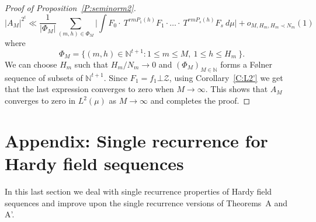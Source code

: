 \documentclass[11pt]{amsart}
\newcommand{\N}{\mathbb{N}}
\theoremstyle{plain}
\theoremstyle{definition}
\theoremstyle{remark}
\begin{document}
\begin{proof}[Proof of Proposition~\ref{P:seminorm2}]
$$
|A_M|^{2^t} \ll\frac{1}{|\Phi_M|}\sum_{(m,h)\in
  \Phi_M}\Big|\int F_0 \cdot\ T^{rmP_1(h)}F_1\cdot \ldots \cdot\
T^{rmP_s(h)}F_s\ d\mu\Big| +o_{M,H_m, H_m\prec N_m}(1)
$$
where
$$
\Phi_{M}=\{ (m,h)\in \mathbb{N}^{t+1}\colon 1\leq m\leq M, \ 1\leq
h\leq H_m\ \}.
$$
We can  choose  $H_m$ such that $H_m/N_m\to 0$ and
$(\Phi_M)_{M\in\N}$ forms a F{\o}lner sequence of subsets of
$\N^{t+1}$.
Since
$F_1=f_1\bot \mathcal{Z}$, using  Corollary~\ref{C:L2'} we get that the last expression converges to zero
when $M\to\infty$. This shows that $A_M$ converges to zero in
$L^2(\mu)$ as $M\to \infty$ and completes the proof.
\end{proof}







\section{Appendix: Single recurrence for Hardy
field  sequences}\label{SS:single}
In this last section we deal with single recurrence properties of Hardy field sequences
and improve upon the single recurrence versions of Theorems~A and A'.
\end{document}
